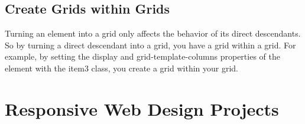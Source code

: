 \documentclass{article}%
\begin{document}
%
\subsection{Create Grids within Grids}%
\label{subsec:CreateGridswithinGrids}%
Turning an element into a grid only affects the behavior of its direct descendants. So by turning a direct descendant into a grid, you  have a grid within a grid.\newline%
For example, by setting the display and grid{-}template{-}columns properties of the element with the item3 class, you create a grid within your grid.\newline%

%
\newpage%
\section{Responsive Web Design Projects}%
\label{sec:ResponsiveWebDesignProjects}%
\end{document}
